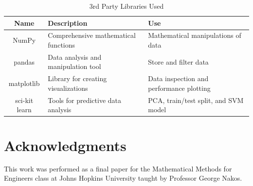 \documentclass[journal]{new-aiaa}
\begin{document}
\begin{table}[H]
  \centering
  \begin{tabular}{|| c | l | l ||} 
          \hline
          Name          & Description & Use \\ [0.5ex] 
          \hline\hline
          NumPy         & Comprehensive mathematical functions \cite{numpy} & Mathematical manipulations of data \\ [0.5ex] 
          \hline
          pandas        & Data analysis and manipulation tool \cite{pandas} & Store and filter data \\ [0.5ex] 
          \hline
          matplotlib    & Library for creating visualizations \cite{matplotlib} & Data inspection and performance plotting \\ [0.5ex] 
          \hline
          sci-kit learn & Tools for predictive data analysis \cite{scikit-learn} & PCA, train/test split, and SVM model \\ [0.5ex] 
          \hline
  \end{tabular}
  \caption{3rd Party Libraries Used}
  \label{table:3rd Party Libraries Used}
\end{table}

\section*{Acknowledgments}\label{sec:Acknowledgments}
This work was performed as a final paper for the Mathematical Methods for Engineers class at Johns Hopkins University taught by Professor George Nakos.


\end{document}

